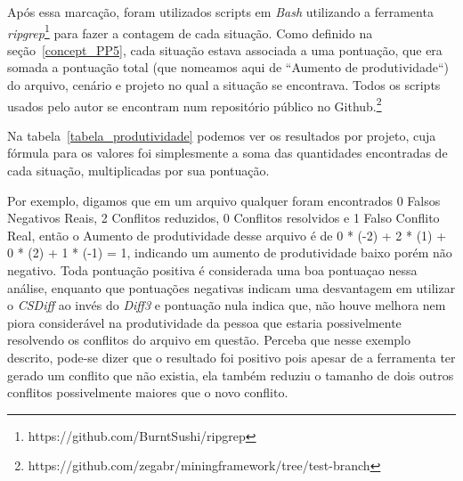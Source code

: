 Após essa marcação, foram utilizados scripts em \emph{Bash} utilizando a
ferramenta \emph{ripgrep}\footnote{https://github.com/BurntSushi/ripgrep} para
fazer a contagem de cada situação. Como definido na seção~\ref{concept_PP5},
cada situação estava associada a uma pontuação, que era somada a pontuação
total (que nomeamos aqui de ``Aumento de produtividade``) do arquivo, cenário e
projeto no qual a situação se encontrava. Todos os scripts usados pelo autor se
encontram num repositório público no
Github.\footnote{https://github.com/zegabr/miningframework/tree/test-branch} %

Na tabela~\ref{tabela_produtividade} podemos ver os resultados por projeto,
cuja fórmula para os valores foi simplesmente a soma das quantidades
encontradas de cada situação, multiplicadas por sua pontuação.

Por exemplo, digamos que em um arquivo qualquer foram encontrados 0 Falsos
Negativos Reais, 2 Conflitos reduzidos, 0 Conflitos resolvidos e 1 Falso
Conflito Real, então o Aumento de produtividade desse arquivo é de 0 * (-2) + 2
* (1) + 0 * (2) + 1 * (-1) = 1, indicando um aumento de produtividade baixo
porém não negativo. Toda pontuação positiva é considerada uma boa pontuaçao
nessa análise, enquanto que pontuações negativas indicam uma desvantagem em
utilizar o \emph{CSDiff} ao invés do \emph{Diff3} e pontuação nula indica que,
não houve melhora nem piora considerável na produtividade da pessoa que estaria
possivelmente resolvendo os conflitos do arquivo em questão. Perceba que nesse
exemplo descrito, pode-se dizer que o resultado foi positivo pois apesar de a
ferramenta ter gerado um conflito que não existia, ela também reduziu o tamanho
de dois outros conflitos possivelmente maiores que o novo conflito.

